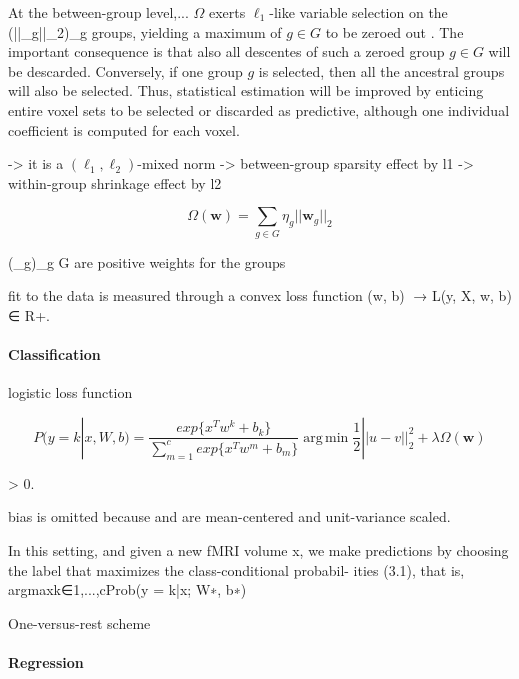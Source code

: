 \documentclass{article} %
\DeclareMathOperator*{\argmin}{arg\,min}
\DeclareMathOperator{\argmin}{argmin}
\begin{document}
At the between-group level,...
$\Omega$ exerts $\ell_1$-like variable selection on
the (||_g||_2)_{g\inG} groups,
yielding a maximum of $g \in G$ to be zeroed out
\cite{jenatton2011structured}.
The important consequence is that also all descentes of such a zeroed
group $g \in G$ will be descarded.
Conversely,
if one group $g$ is selected,
then all the ancestral groups will also be selected.
Thus, statistical estimation will be improved by enticing
entire voxel sets to be selected or discarded as predictive, 
although one individual coefficient is computed for each voxel.

-> it is a $(\ell_1, \ell_2)$-mixed norm
-> between-group sparsity effect by l1
-> within-group shrinkage effect by l2


\begin{equation}
  \Omega(\mathbf{w}) = \sum_{g \in G} \eta_g ||\mathbf{w}_g||_2
\end{equation}

(\eta_g)_{g \in G} are positive weights for the groups


fit to the data is measured through
a convex loss function (w, b) 􏰀→ L(y, X, w, b) ∈ R+. 


\paragraph{Classification}

logistic loss function

\begin{equation}
  P(y=k|x, W, b) = \frac{exp\{x^Tw^k + b_k\}}{\sum_{m=1}^cexp\{x^Tw^m + b_m\}}

  \argmin \frac{1}{2}||u-v||_2^2 + \lambda\Omega(\mathbf{w})

\end{equation}

\lambda > 0.

bias is omitted because  and 
are mean-centered and unit-variance scaled.

In this setting, and given a new fMRI volume x,
we make predictions by choosing the label that maximizes
the class-conditional probabil- ities (3.1), that is, argmaxk∈{1,...,c}Prob(y = k|x; W∗, b∗)

One-versus-rest scheme


\paragraph{Regression}
\end{document}
